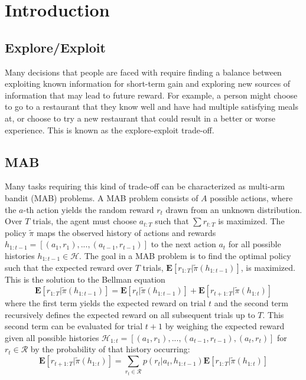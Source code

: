 \documentclass[10pt,letterpaper]{article}
\title{}
\author{}
\begin{document}
	
	\maketitle
	
	
	\begin{abstract}
		
		

		
	\end{abstract}
	
	
	\section{Introduction}
	
	\subsection{Explore/Exploit}
	
	Many decisions that people are faced with require finding a balance between exploiting known information for short-term gain and exploring new sources of information that may lead to future reward. For example, a person might choose to go to a restaurant that they know well and have had multiple satisfying meals at, or choose to try a new restaurant that could result in a better or worse experience. This is known as the explore-exploit trade-off.
	
	\subsection{MAB}
	
	Many tasks requiring this kind of trade-off can be characterized as multi-arm bandit (MAB) problems. A MAB problem consists of $A$ possible actions, where the $a$-th action yields the random reward $r_{t}$ drawn from an unknown distribution. Over $T$ trials, the agent must choose $a_{t:T}$ such that $\sum r_{t:T}$ is maximized. The policy $\tilde{\pi}$ maps the observed history of actions and rewards $h_{1:t-1} = [(a_{1}, r_{1}),...,(a_{t-1}, r_{t-1})]$ to the next action $a_{t}$ for all possible histories $h_{1:t-1} \in \mathcal{H}$. The goal in a MAB problem is to find the optimal policy such that the expected reward over $T$ trials, $\mathbf{E}[r_{1:T} | \tilde{\pi}( h_{1:t-1})]$, is maximized. This is the solution to the Bellman equation
	$$\mathbf{E}[r_{1:T} | \tilde{\pi}( h_{1:t-1})] = \mathbf{E}[r_{t} | \tilde{\pi}(h_{1:t-1})] + \mathbf{E}[r_{t+1:T} | \tilde{\pi}( h_{1:t})]$$
	where the first term yields the expected reward on trial $t$ and the second term recursively defines the expected reward on all subsequent trials up to $T$. This second term can be evaluated for trial $t+1$ by weighing the expected reward given all possible histories $ \mathcal{ H}_{1:t} = [(a_{1}, r_{1}),...,(a_{t-1},r_{t-1}),(a_{t},r_{t})]$ for $r_{t} \in \mathcal{R}$ by the probability of that history occurring:
	$$\mathbf{E}[r_{t+1:T} | \tilde{\pi}( h_{1:t})] = \sum_{r_{t} \in \mathcal{R}} p(r_{t} | a_{t}, h_{1:t-1}) \mathbf{E}[r_{1:T} | \tilde{\pi}( h_{1:t})]$$
\end{document}
